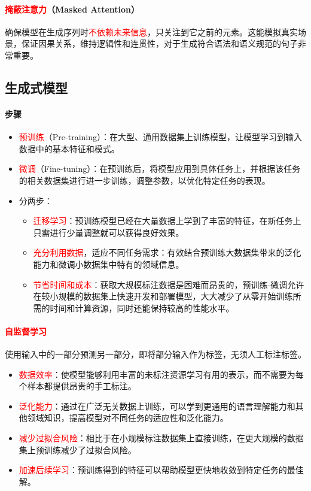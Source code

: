 \documentclass[
12pt, %
a4paper, 
oneside, %
]{scrartcl}
\begin{document}
\paragraph{\textcolor{red}{掩蔽注意力}（Masked Attention）}
确保模型在生成序列时\textcolor{red}{不依赖未来信息}，只关注到它之前的元素。这能模拟真实场景，保证因果关系，维持逻辑性和连贯性，对于生成符合语法和语义规范的句子非常重要。
\subsection[生成式模型]{生成式模型}
\paragraph{步骤}
\begin{itemize}
\item \textcolor{red}{预训练}（Pre-training）：在大型、通用数据集上训练模型，让模型学习到输入数据中的基本特征和模式。
\item \textcolor{red}{微调}（Fine-tuning）：在预训练后，将模型应用到具体任务上，并根据该任务的相关数据集进行进一步训练，调整参数，以优化特定任务的表现。
\item 分两步：
\begin{itemize}
\item \textcolor{red}{迁移学习}：预训练模型已经在大量数据上学到了丰富的特征，在新任务上只需进行少量调整就可以获得良好效果。
\item \textcolor{red}{充分利用数据}，适应不同任务需求：有效结合预训练大数据集带来的泛化能力和微调小数据集中特有的领域信息。
\item \textcolor{red}{节省时间和成本}：获取大规模标注数据是困难而昂贵的，预训练-微调允许在较小规模的数据集上快速开发和部署模型，大大减少了从零开始训练所需的时间和计算资源，同时还能保持较高的性能水平。
\end{itemize}
\end{itemize}
\paragraph{\textcolor{red}{自监督学习}}
使用输入中的一部分预测另一部分，即将部分输入作为标签，无须人工标注标签。
\begin{itemize}
\item \textcolor{red}{数据效率}：使模型能够利用丰富的未标注资源学习有用的表示，而不需要为每个样本都提供昂贵的手工标注。
\item \textcolor{red}{泛化能力}：通过在广泛无关数据上训练，可以学到更通用的语言理解能力和其他领域知识，提高模型对不同任务的适应性和泛化能力。
\item \textcolor{red}{减少过拟合风险}：相比于在小规模标注数据集上直接训练，在更大规模的数据集上预训练减少了过拟合风险。
\item \textcolor{red}{加速后续学习}：预训练得到的特征可以帮助模型更快地收敛到特定任务的最佳解。
\end{itemize}
\end{document}
